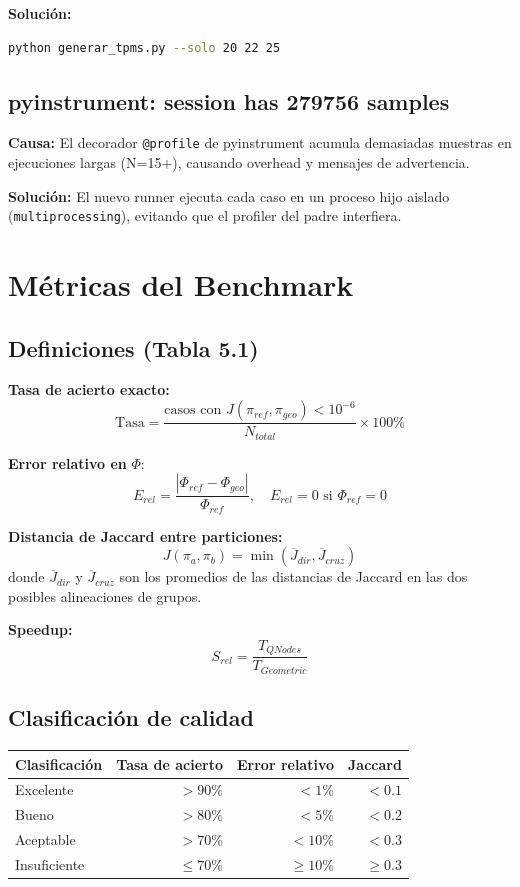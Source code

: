 \documentclass[12pt,a4paper]{article}
\begin{document}
\textbf{Solución:}
\begin{lstlisting}[language=bash]
python generar_tpms.py --solo 20 22 25
\end{lstlisting}

\subsection{pyinstrument: session has 279756 samples}
\textbf{Causa:} El decorador \texttt{@profile} de pyinstrument acumula demasiadas muestras en ejecuciones largas (N=15+), causando overhead y mensajes de advertencia.

\textbf{Solución:} El nuevo runner ejecuta cada caso en un proceso hijo aislado (\texttt{multiprocessing}), evitando que el profiler del padre interfiera.

\section{Métricas del Benchmark}

\subsection{Definiciones (Tabla 5.1)}

\textbf{Tasa de acierto exacto:}
\[ \text{Tasa} = \frac{\text{casos con } J(\pi_{ref}, \pi_{geo}) < 10^{-6}}{N_{total}} \times 100\% \]

\textbf{Error relativo en } $\Phi$:
\[ E_{rel} = \frac{|\Phi_{ref} - \Phi_{geo}|}{\Phi_{ref}}, \quad E_{rel} = 0 \text{ si } \Phi_{ref} = 0 \]

\textbf{Distancia de Jaccard entre particiones:}
\[ J(\pi_a, \pi_b) = \min\left( \overline{J}_{dir}, \overline{J}_{cruz} \right) \]
donde $\overline{J}_{dir}$ y $\overline{J}_{cruz}$ son los promedios de las distancias de Jaccard en las dos posibles alineaciones de grupos.

\textbf{Speedup:}
\[ S_{rel} = \frac{T_{QNodes}}{T_{Geometric}} \]

\subsection{Clasificación de calidad}
\begin{longtable}{lrrr}
    \toprule
    Clasificación & Tasa de acierto & Error relativo & Jaccard \\
    \midrule
    \endhead
    Excelente    & $> 90\%$ & $< 1\%$  & $< 0.1$ \\
    Bueno        & $> 80\%$ & $< 5\%$  & $< 0.2$ \\
    Aceptable    & $> 70\%$ & $< 10\%$ & $< 0.3$ \\
    Insuficiente & $\leq 70\%$ & $\geq 10\%$ & $\geq 0.3$ \\
    \bottomrule
\end{longtable}
\end{document}
